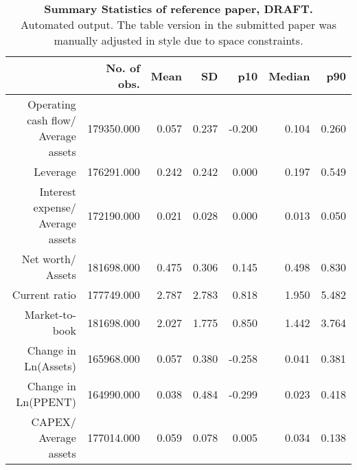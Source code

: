 \begin{table}[ht]
\centering
\caption{\textbf{Summary Statistics of reference paper, DRAFT.} \\
                     Automated output. The table version in the submitted paper 
                     was manually adjusted in style due to space constraints.} 
\begin{tabular}{rrrrrrr}
  \hline
 & No. of obs. & Mean & SD & p10 & Median & p90 \\ 
  \hline
Operating cash flow/ Average assets & 179350.000 & 0.057 & 0.237 & -0.200 & 0.104 & 0.260 \\ 
  Leverage & 176291.000 & 0.242 & 0.242 & 0.000 & 0.197 & 0.549 \\ 
  Interest expense/ Average assets & 172190.000 & 0.021 & 0.028 & 0.000 & 0.013 & 0.050 \\ 
  Net worth/ Assets & 181698.000 & 0.475 & 0.306 & 0.145 & 0.498 & 0.830 \\ 
  Current ratio & 177749.000 & 2.787 & 2.783 & 0.818 & 1.950 & 5.482 \\ 
  Market-to-book & 181698.000 & 2.027 & 1.775 & 0.850 & 1.442 & 3.764 \\ 
  Change in Ln(Assets) & 165968.000 & 0.057 & 0.380 & -0.258 & 0.041 & 0.381 \\ 
  Change in Ln(PPENT) & 164990.000 & 0.038 & 0.484 & -0.299 & 0.023 & 0.418 \\ 
  CAPEX/ Average assets & 177014.000 & 0.059 & 0.078 & 0.005 & 0.034 & 0.138 \\ 
   \hline
\end{tabular}
\end{table}
